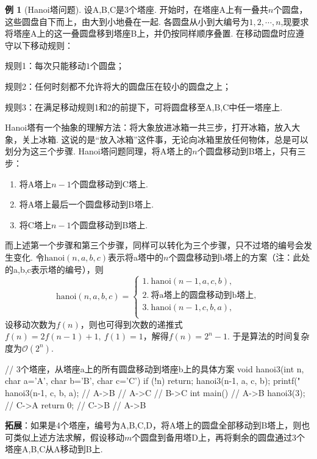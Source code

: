 \documentclass[12pt, a4paper, oneside]{ctexart}
\numberwithin{equation}{section}  %
\theoremstyle{definition}
\newtheorem{example}{例}[section]
\def\O{\mathcal{O}}         %
\begin{document}
\begin{example}[Hanoi塔问题]
设A,B,C是3个塔座. 开始时，在塔座A上有一叠共$n$个圆盘，这些圆盘自下而上，由大到小地叠在一起. 各圆盘从小到大编号为$1,2,\cdots,n$,现要求将塔座A上的这一叠圆盘移到塔座B上，并仍按同样顺序叠置. 在移动圆盘时应遵守以下移动规则：

规则1：每次只能移动$1$个圆盘；

规则2：任何时刻都不允许将大的圆盘压在较小的圆盘之上；

规则3：在满足移动规则1和2的前提下，可将圆盘移至A,B,C中任一塔座上.

Hanoi塔有一个抽象的理解方法：将大象放进冰箱一共三步，打开冰箱，放入大象，关上冰箱. 这说的是“放入冰箱”这件事，无论向冰箱里放任何物体，总是可以划分为这三个步骤. Hanoi塔问题同理，将A塔上的$n$个圆盘移动到B塔上，只有三步：
\begin{enumerate}
    \item 将A塔上$n-1$个圆盘移动到C塔上.
    \item 将A塔上最后一个圆盘移动到B塔上.
    \item 将C塔上$n-1$个圆盘移动到B塔上.
\end{enumerate}
而上述第一个步骤和第三个步骤，同样可以转化为三个步骤，只不过塔的编号会发生变化. 
令$\text{hanoi}(n,a,b,c)$表示将a塔中的$n$个圆盘移动到b塔上的方案（注：此处的a,b,c表示塔的编号），则
\begin{equation*}
    \text{hanoi}(n,a,b,c) = \begin{cases}
        1.\ \text{hanoi}(n-1,a,c,b),\\
        2.\ \text{将a塔上的圆盘移动到b塔上},\\
        3.\ \text{hanoi}(n-1,c,b,a),\\
    \end{cases}
\end{equation*}
设移动次数为$f(n)$，则也可得到次数的递推式$f(n) = 2f(n-1)+1,\ f(1) = 1$，解得$f(n) = 2^n-1$. 
于是算法的时间复杂度为$\O(2^n)$.
\begin{cppcode}
// 3个塔座，从塔座a上的所有圆盘移动到塔座b上的具体方案
void hanoi3(int n, char a='A', char b='B', char c='C') {
    if (!n) return;
    hanoi3(n-1, a, c, b);
    printf("%
    hanoi3(n-1, c, b, a);         //  A->B
}                                 //  A->C
                                  //  B->C
int main() {                      //  A->B
    hanoi3(3);                    //  C->A
    return 0;                     //  C->B
}                                 //  A->B
\end{cppcode}
\textbf{拓展}：如果是4个塔座，编号为A,B,C,D，将A塔上的圆盘全部移动到B塔上，则也可类似上述方法求解，假设移动$m$个圆盘到备用塔D上，再将剩余的圆盘通过3个塔座A,B,C从A移动到B上.


\end{example}
\end{document}
